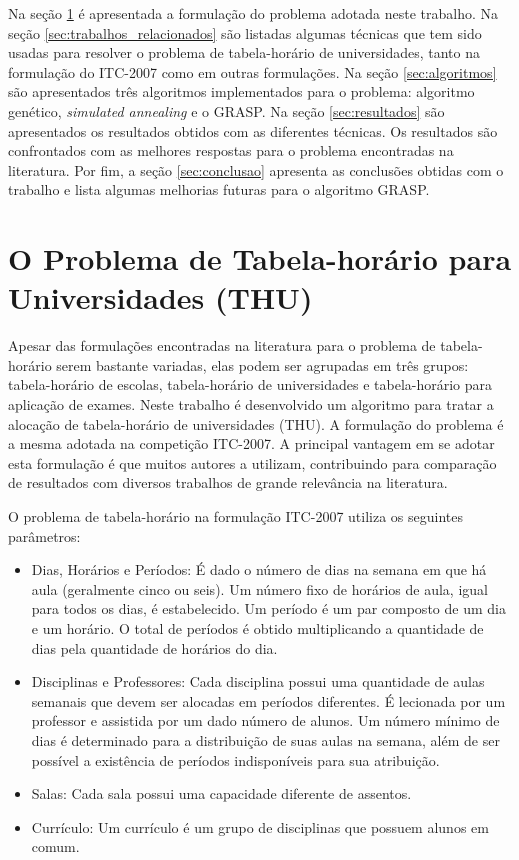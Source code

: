 \documentclass[11pt]{article}
\begin{document}
Na seção \ref{sec:problema} é apresentada a formulação do problema adotada neste trabalho. Na seção \ref{sec:trabalhos_relacionados} são listadas algumas técnicas que tem sido usadas para resolver o problema de tabela-horário de universidades, tanto na formulação do ITC-2007 como em outras formulações. Na seção \ref{sec:algoritmos} são apresentados três algoritmos implementados para o problema: algoritmo genético, \textit{simulated annealing} e o GRASP. Na seção \ref{sec:resultados} são apresentados os resultados obtidos com as diferentes técnicas. Os resultados são confrontados com as melhores respostas para o problema encontradas na literatura. Por fim, a seção \ref{sec:conclusao} apresenta as conclusões obtidas com o trabalho e lista algumas melhorias futuras para o algoritmo GRASP.

\section{O Problema de Tabela-horário para Universidades (THU)}
\label{sec:problema}

Apesar das formulações encontradas na literatura para o problema de tabela-horário serem bastante variadas, elas podem ser agrupadas em três grupos: tabela-horário de escolas, tabela-horário de universidades e tabela-horário para aplicação de exames. Neste trabalho é desenvolvido um algoritmo para tratar a alocação de tabela-horário de universidades (THU). A formulação do problema é a mesma adotada na competição ITC-2007. A principal vantagem em se adotar esta formulação é que muitos autores a utilizam, contribuindo para comparação de resultados com diversos trabalhos de grande relevância na literatura.

O problema de tabela-horário na formulação ITC-2007 utiliza os seguintes parâmetros:

\begin{itemize}

\item Dias, Horários e Períodos: É dado o número de dias na semana em que há aula (geralmente cinco ou seis). Um número fixo de horários de aula, igual para todos os dias, é estabelecido. Um período é um par composto de um dia e um horário. O total de períodos é obtido multiplicando a quantidade de dias pela quantidade de horários do dia.

\item Disciplinas e Professores: Cada disciplina possui uma quantidade de aulas semanais que devem ser alocadas em períodos diferentes. É lecionada por um professor e assistida por um dado número de alunos. Um número mínimo de dias é determinado para a distribuição de suas aulas na semana, além de ser possível a existência de períodos indisponíveis para sua atribuição.

\item Salas: Cada sala possui uma capacidade diferente de assentos.

\item Currículo: Um currículo é um grupo de disciplinas que possuem alunos em comum.

\end{itemize}
\end{document}
